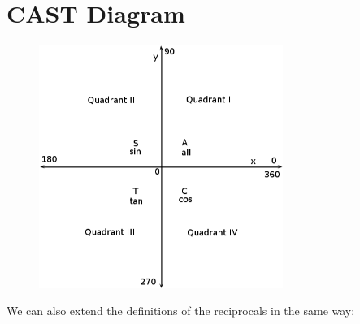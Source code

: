 \section{CAST Diagram}
\begin{figure}[H] %
    \begin{center}
    \label{m39411*id63358!!!underscore!!!media}\label{m39411*id63358!!!underscore!!!printimage}\includegraphics[width=300px]{col11306.imgs/m39411_CAST.png} %
      \vspace{2pt}
    \vspace{.1in}
    \end{center}
 \end{figure}       \par \label{m39411*eip-927}We can also extend the definitions of the reciprocals in the same way:
\label{m39411*id89342}\nopagebreak\noindent{}
